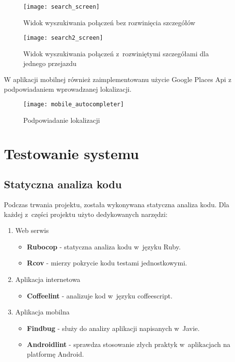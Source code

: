 \documentclass[eng,archivemode]{mgr}
\begin{document}
\begin{figure}[H]
	\centering
	\begin{minipage}{0.45\textwidth}
		\centering
		\texttt{[image: search\_screen]}
		\caption{Widok wyszukiwania połączeń bez rozwinięcia szczegółów}
	\end{minipage}\hfill
	\begin{minipage}{0.45\textwidth}
		\centering
		\texttt{[image: search2\_screen]}
		\caption{Widok wyszukiwania połączeń z~rozwiniętymi szczegółami dla jednego przejazdu}
	\end{minipage}
\end{figure}
\newpage
W aplikacji mobilnej również zaimplementowanu użycie Google Places Api z podpowiadaniem wprowadzanej lokalizacji.
\begin{figure}[H]
	\centering
	\texttt{[image: mobile\_autocompleter]}
	\caption{Podpowiadanie lokalizacji}
\end{figure}

\chapter{Testowanie systemu}
\label{chpt:testy}
\section{Statyczna analiza kodu}
Podczas trwania projektu, została wykonywana statyczna analiza kodu. Dla każdej z~części projektu użyto dedykowanych narzędzi:
\begin{enumerate}[label={\alph*}\\) ]
	\item Web serwis
	\begin{itemize}
		\item \textbf{Rubocop} - statyczna analiza kodu w~języku Ruby.
		\item \textbf{Rcov} - mierzy pokrycie kodu testami jednostkowymi.
	\end{itemize}
	\item Aplikacja internetowa
	\begin{itemize}
		\item \textbf{Coffeelint} - analizuje kod w~języku coffeescript.
	\end{itemize}
	\item Aplikacja mobilna 
	\begin{itemize}
		\item \textbf{Findbug} - służy do analizy aplikacji napisanych w~Javie. 
		\item \textbf{Androidlint} - sprawdza stosowanie złych praktyk w~aplikacjach na platformę Android.
	\end{itemize}
\end{enumerate}
\end{document}
